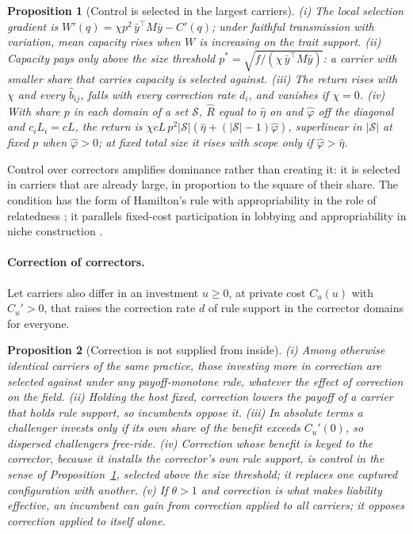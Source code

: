 \documentclass[letterpaper]{article} %
\newtheorem{proposition}{Proposition}
\theoremstyle{definition}
\newcommand{\cS}{\mathcal{S}}
\begin{document}
\begin{proposition}[Control is selected in the largest carriers]\label{prop:control}
(i) The local selection gradient is $W'(q)=\chi p^2\,\bar y^\top M\bar y-C'(q)$; under faithful transmission with variation, mean capacity rises when $W$ is increasing on the trait support. (ii) Capacity pays only above the size threshold $p^\ast=\sqrt{f/(\chi\,\bar y^\top M\bar y)}$: a carrier with smaller share that carries capacity is selected against. (iii) The return rises with $\chi$ and every $\hat b_{ij}$, falls with every correction rate $d_i$, and vanishes if $\chi=0$. (iv) With share $p$ in each domain of a set $\cS$, $\hat R$ equal to $\hat\eta$ on and $\hat\varphi$ off the diagonal and $c_iL_i=cL$, the return is $\chi cL\,p^2|\cS|(\hat\eta+(|\cS|-1)\hat\varphi)$, superlinear in $|\cS|$ at fixed $p$ when $\hat\varphi>0$; at fixed total size it rises with scope only if $\hat\varphi>\hat\eta$.
\end{proposition}

Control over correctors amplifies dominance rather than creating it: it is selected in carriers that are already large, in proportion to the square of their share. The condition has the form of Hamilton's rule with appropriability in the role of relatedness \citep{hamilton1964,price1970}; it parallels fixed-cost participation in lobbying \citep{bombardini2008} and appropriability in niche construction \citep{krakauer2009,lehmann2008,gerlee2015}.

\paragraph{Correction of correctors.} Let carriers also differ in an investment $u\ge0$, at private cost $C_u(u)$ with $C_u'>0$, that raises the correction rate $d$ of rule support in the corrector domains for everyone.

\begin{proposition}[Correction is not supplied from inside]\label{prop:correction}
(i) Among otherwise identical carriers of the same practice, those investing more in correction are selected against under any payoff-monotone rule, whatever the effect of correction on the field. (ii) Holding the host fixed, correction lowers the payoff of a carrier that holds rule support, so incumbents oppose it. (iii) In absolute terms a challenger invests only if its own share of the benefit exceeds $C_u'(0)$, so dispersed challengers free-ride. (iv) Correction whose benefit is keyed to the corrector, because it installs the corrector's own rule support, is control in the sense of Proposition~\ref{prop:control}, selected above the size threshold; it replaces one captured configuration with another. (v) If $\theta>1$ and correction is what makes liability effective, an incumbent can gain from correction applied to all carriers; it opposes correction applied to itself alone.
\end{proposition}
\end{document}

